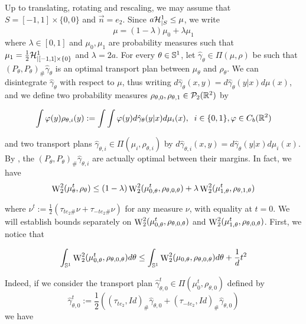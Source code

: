     Up to translating, rotating and rescaling, we may assume that $S = [-1,1] \times \{0,0\}$ and $\vec{n} = e_2$. Since $a \mathcal{H}^1_{|S} \leq \mu$, we write
    \begin{equation} \mu = (1-\lambda) \mu_0 + \lambda \mu_1 \end{equation}
    where $\lambda \in [0,1]$ and $\mu_0,\mu_1$ are probability measures such that $\mu_1 = \frac{1}{2} \mathcal{H}^1_{|[-1,1] \times \{0\}}$ and $\lambda = 2a$. For every $\theta \in \mathbb S^1$, let $\hat{\gamma}_\theta \in \Pi(\mu,\rho)$ be such that $(P_\theta,P_\theta)_\#\hat{\gamma}_\theta$ is an optimal transport plan between $\mu_\theta$ and $\rho_\theta$. We can disintegrate $\hat{\gamma}_\theta$ with respect to $\mu$, thus writing $d\hat{\gamma}_\theta(x,y) = d\hat{\gamma}_\theta(y|x) d\mu(x)$, and we define two probability measures $\rho_{\theta,0}, \rho_{\theta,1} \in \mathcal{P}_2(\mathbb R^2)$ by
    
    \begin{equation} \int \varphi(y) \rho_{\theta,i}(y) := \int \int \varphi(y) d\hat{\gamma}_\theta(y|x) d\mu_i(x), \;\; i \in \{0,1\}, \varphi \in C_b(\mathbb R^2) \end{equation}
    
    and two transport plans $\hat{\gamma}_{\theta,i} \in \Pi(\mu_i, \rho_{\theta,i})$ by $d\hat{\gamma}_{\theta,i}(x,y) = d\hat{\gamma}_\theta(y|x) d\mu_i(x)$. By \citep[Theorem 4.6]{villani2008OldNew}, the $(P_\theta,P_\theta)_\#\hat{\gamma}_{\theta,i}$ are actually optimal between their margins. In fact, we have
    \begin{equation} \mathop{\mathrm{W}}\nolimits^2_2(\mu^t_\theta, \rho_\theta) \leq (1-\lambda) \mathop{\mathrm{W}}\nolimits^2_2(\mu^t_{0,\theta},\rho_{\theta,0,\theta}) + \lambda \mathop{\mathrm{W}}\nolimits^2_2(\mu^t_{1,\theta}, \rho_{\theta,1,\theta}) \end{equation}

    where $\nu^t := \frac{1}{2} (\tau_{te_2\#}\nu + \tau_{-te_2\#}\nu)$ for any measure $\nu$, with equality at $t = 0$. We will establish bounds separately on $\mathop{\mathrm{W}}\nolimits^2_2(\mu^t_{0,\theta},\rho_{\theta,0,\theta})$ and $\mathop{\mathrm{W}}\nolimits^2_2(\mu^t_{1,\theta},\rho_{\theta,0,\theta})$. First, we notice that 

    \begin{equation}
        \label{eq:proof_eq_l138}
        \int_{\mathbb S^1} \mathop{\mathrm{W}}\nolimits^2_2(\mu^t_{0,\theta},\rho_{\theta,0,\theta})d\theta \leq \int_{\mathbb S^1} \mathop{\mathrm{W}}\nolimits^2_2(\mu_{0,\theta},\rho_{\theta,0,\theta})d\theta + \frac{1}{d} t^2
    \end{equation} 

    Indeed, if we consider the transport plan $\hat{\gamma}_{\theta,0}^t \in \Pi(\mu_0^t, \rho_{\theta,0})$ defined by
    \begin{equation} \hat{\gamma}_{\theta,0}^t := \frac{1}{2} ((\tau_{te_2},Id)_\#\hat{\gamma}_{\theta,0} + (\tau_{-te_2},Id)_\#\hat{\gamma}_{\theta,0}) \end{equation}
    we have 

